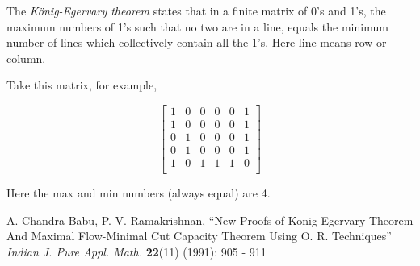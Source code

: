 \documentclass[12pt]{article}
\begin{document}
The {\em K\"onig-Egervary theorem} states that in a finite matrix of 0's and 1's, the maximum numbers of 1's such that no two are in a line, equals the minimum number of lines which collectively contain all the 1's. Here line means row or column.

Take this matrix, for example,

$$\begin{bmatrix}
1 & 0 & 0 & 0 & 0 & 1 \\
1 & 0 & 0 & 0 & 0 & 1 \\
0 & 1 & 0 & 0 & 0 & 1 \\
0 & 1 & 0 & 0 & 0 & 1 \\
1 & 0 & 1 & 1 & 1 & 0 \\
\end{bmatrix}$$

Here the max and min numbers (always equal) are 4.

\begin{thebibliography}{1}
 A. Chandra Babu, P. V. Ramakrishnan, ``New Proofs of Konig-Egervary Theorem And Maximal Flow-Minimal Cut Capacity Theorem Using O. R. Techniques'' {\it Indian J. Pure 
Appl. Math.} {\bf 22}(11) (1991): 905 - 911
\end{thebibliography}
\end{document}

